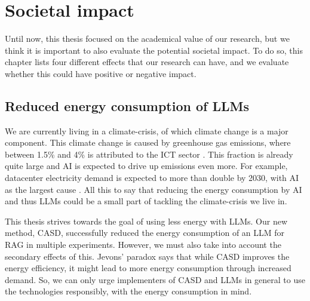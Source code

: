
\chapter{Societal impact}
\label{sec:societal_impact}

Until now, this thesis focused on the academical value of our research, but we think it is important to also evaluate the potential societal impact. To do so, this chapter lists four different effects that our research can have, and we evaluate whether this could have positive or negative impact.

\section{Reduced energy consumption of LLMs}
We are currently living in a climate-crisis, of which climate change is a major component. This climate change is caused by greenhouse gas emissions, where between 1.5\% and 4\% is attributed to the ICT sector \cite{ayers2025measuring}. This fraction is already quite large and AI is expected to drive  up emissions even more. For example, datacenter electricity demand is expected to more than double by 2030, with AI as the largest cause \cite{iea2025ai}. All this to say that reducing the energy consumption by AI and thus LLMs could be a small part of tackling the climate-crisis we live in.

This thesis strives towards the goal of using less energy with LLMs. Our new method, CASD, successfully reduced the energy consumption of an LLM for RAG in multiple experiments. However, we must also take into account the secondary effects of this. Jevons' paradox \cite{alcott2005jevons} says that while CASD improves the energy efficiency, it might lead to more energy consumption through increased demand. So, we can only urge implementers of CASD and LLMs in general to use the technologies responsibly, with the energy consumption in mind.

